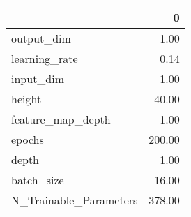 \begin{tabular}{lr}
\toprule
{} &       0 \\
\midrule
output\_dim             &    1.00 \\
learning\_rate          &    0.14 \\
input\_dim              &    1.00 \\
height                 &   40.00 \\
feature\_map\_depth      &    1.00 \\
epochs                 &  200.00 \\
depth                  &    1.00 \\
batch\_size             &   16.00 \\
N\_Trainable\_Parameters &  378.00 \\
\bottomrule
\end{tabular}
